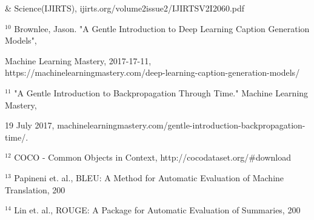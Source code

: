 \documentclass[10pt, oneside]{article}   	%
\begin{document}
\& Science(IJIRTS), ijirts.org/volume2issue2/IJIRTSV2I2060.pdf

\vspace{3mm}
$^{10}$ Brownlee, Jason. "A Gentle Introduction to Deep Learning Caption Generation Models",

Machine Learning Mastery, 2017-17-11,
https://machinelearningmastery.com/deep-learning-caption-generation-models/

\vspace{3mm}
$^{11}$ "A Gentle Introduction to Backpropagation Through Time." Machine Learning Mastery, 

19 July 2017, machinelearningmastery.com/gentle-introduction-backpropagation-time/. 

\vspace{3mm}
$^{12}$ COCO - Common Objects in Context, http://cocodataset.org/\#download

\vspace{3mm}
$^{13}$ Papineni et. al., BLEU: A Method for Automatic Evaluation of Machine Translation, 200

\vspace{3mm}
$^{14}$ Lin et. al., ROUGE: A Package for Automatic Evaluation of Summaries, 200
\end{document}
